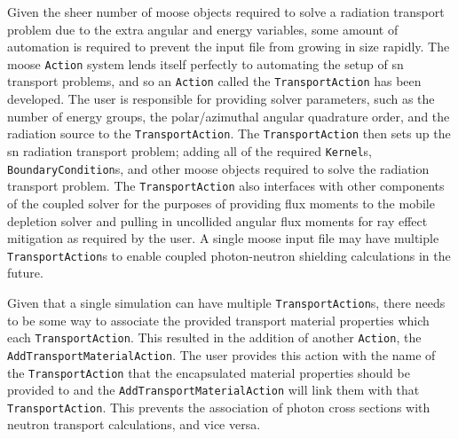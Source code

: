 Given the sheer number of \acrshort{moose} objects required to solve a radiation transport problem due to the extra angular and energy variables, some amount of automation is required to prevent the input file from growing in size rapidly. The \acrshort{moose} \texttt{Action} system lends itself perfectly to automating the setup of \acrshort{sn} transport problems, and so an \texttt{Action} called the \texttt{TransportAction} has been developed. The user is responsible for providing solver parameters, such as the number of energy groups, the polar/azimuthal angular quadrature order, and the radiation source to the \texttt{TransportAction}. The \texttt{TransportAction} then sets up the \acrshort{sn} radiation transport problem; adding all of the required \texttt{Kernel}s, \texttt{BoundaryCondition}s, and other \acrshort{moose} objects required to solve the radiation transport problem. The \texttt{TransportAction} also interfaces with other components of the coupled solver for the purposes of providing flux moments to the mobile depletion solver and pulling in uncollided angular flux moments for ray effect mitigation as required by the user. A single \acrshort{moose} input file may have multiple \texttt{TransportAction}s to enable coupled photon-neutron shielding calculations in the future.

Given that a single simulation can have multiple \texttt{TransportAction}s, there needs to be some way to associate the provided transport material properties which each \texttt{TransportAction}. This resulted in the addition of another \texttt{Action}, the \texttt{AddTransportMaterialAction}. The user provides this action with the name of the \texttt{TransportAction} that the encapsulated material properties should be provided to and the \texttt{AddTransportMaterialAction} will link them with that \texttt{TransportAction}. This prevents the association of photon cross sections with neutron transport calculations, and vice versa. 

